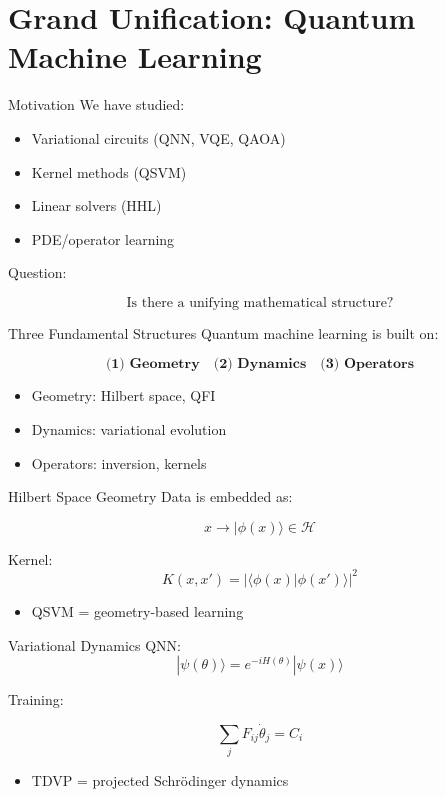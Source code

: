\documentclass{beamer}
\begin{document}
\section{Grand Unification: Quantum Machine Learning}

\begin{frame}{Motivation}
We have studied:

\begin{itemize}
\item Variational circuits (QNN, VQE, QAOA)
\item Kernel methods (QSVM)
\item Linear solvers (HHL)
\item PDE/operator learning
\end{itemize}

\medskip

Question:

\[
\boxed{
\text{Is there a unifying mathematical structure?}
}
\]
\end{frame}

\begin{frame}{Three Fundamental Structures}
Quantum machine learning is built on:

\[
\textbf{(1) Geometry} \quad \textbf{(2) Dynamics} \quad \textbf{(3) Operators}
\]

\begin{itemize}
\item Geometry: Hilbert space, QFI
\item Dynamics: variational evolution
\item Operators: inversion, kernels
\end{itemize}
\end{frame}

\begin{frame}{Hilbert Space Geometry}
Data is embedded as:

\[
x \rightarrow |\phi(x)\rangle \in \mathcal{H}
\]

Kernel:
\[
K(x,x') = |\langle \phi(x)|\phi(x')\rangle|^2
\]

\begin{itemize}
\item QSVM = geometry-based learning
\end{itemize}
\end{frame}

\begin{frame}{Variational Dynamics}
QNN:
\[
|\psi(\theta)\rangle = e^{-iH(\theta)}|\psi(x)\rangle
\]

Training:

\[
\sum_j F_{ij}\dot{\theta}_j = C_i
\]

\begin{itemize}
\item TDVP = projected Schrödinger dynamics
\end{itemize}
\end{frame}
\end{document}
